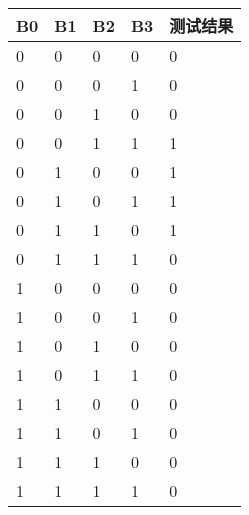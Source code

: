 \documentclass[a4paper,12pt]{article}
\begin{document}
\begin{table}[h]
\begin{minipage}{0.48\textwidth}
       \begin{tabular}{|l|l|l|l|l|}
           \hline
           \textbf{B0} & \textbf{B1} & \textbf{B2} & \textbf{B3} & \textbf{测试结果} \\ \hline
           0           & 0           & 0           & 0           & 0          \\ \hline
           0           & 0           & 0           & 1           & 0          \\ \hline
           0           & 0           & 1           & 0           & 0          \\ \hline
           0           & 0           & 1           & 1           & 1          \\ \hline
           0           & 1           & 0           & 0           & 1          \\ \hline
           0           & 1           & 0           & 1           & 1          \\ \hline
           0           & 1           & 1           & 0           & 1          \\ \hline
           0           & 1           & 1           & 1           & 0          \\ \hline
           1           & 0           & 0           & 0           & 0          \\ \hline
           1           & 0           & 0           & 1           & 0          \\ \hline
           1           & 0           & 1           & 0           & 0          \\ \hline
           1           & 0           & 1           & 1           & 0          \\ \hline
           1           & 1           & 0           & 0           & 0          \\ \hline
           1           & 1           & 0           & 1           & 0          \\ \hline
           1           & 1           & 1           & 0           & 0          \\ \hline
           1           & 1           & 1           & 1           & 0          \\ \hline
       \end{tabular}
   \end{minipage}
\end{table}
\end{document}
